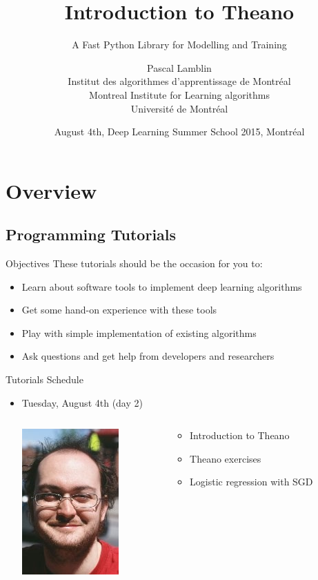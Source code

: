 \documentclass[a4paper,9pt]{beamer}
\title[Intro to Theano]{Introduction to Theano}
\subtitle{A Fast Python Library for Modelling and Training}
\author[LISA lab]{Pascal Lamblin \\
Institut des algorithmes d'apprentissage de Montréal\\
Montreal Institute for Learning algorithms\\
Université de Montréal}
\date{%
August 4th, Deep Learning Summer School 2015, Montréal
}
\begin{document}
\frame{\titlepage}

\section{Overview}
\begin{frame}
  \tableofcontents[currentsection]
\end{frame}

\subsection{Programming Tutorials}

\begin{frame}{Objectives}
  These tutorials should be the occasion for you to:
  \begin{itemize}
    \item Learn about software tools to implement deep learning algorithms
    \item Get some hand-on experience with these tools
    \item Play with simple implementation of existing algorithms
    \item Ask questions and get help from developers and researchers
  \end{itemize}
\end{frame}

\begin{frame}{Tutorials Schedule}
  \begin{itemize}
    \item<1-> Tuesday, August 4th (day 2)
      \begin{columns}
        \begin{column}{.3\textwidth}
          \includegraphics{lamblinp.jpg}
        \end{column}
        \begin{column}
      \begin{itemize}
        \item Introduction to Theano
        \item Theano exercises
        \item Logistic regression with SGD
      \end{itemize}
        \end{column}
      \end{columns}
  \end{itemize}
\end{frame}
\end{document}
